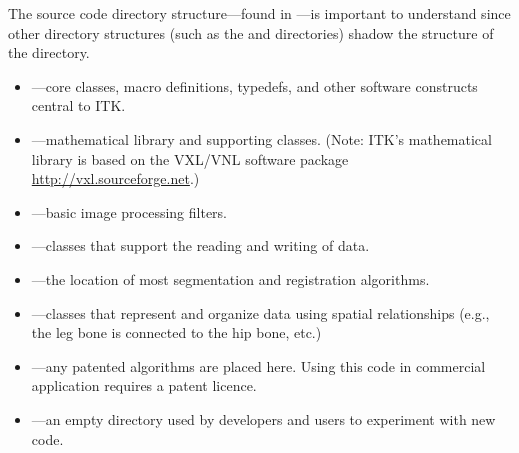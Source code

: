 The source code directory structure---found in ---is 
important to understand since other directory structures (such as the
 and  directories) shadow the structure of the
 directory.
\begin{itemize}
        \item {}---core classes, macro definitions,
        typedefs, and other software constructs central to ITK.
        \item {}---mathematical library and
        supporting classes. (Note: ITK's mathematical library is based
        on the VXL/VNL software package \url{http://vxl.sourceforge.net}.)
        \item {}---basic image processing
        filters.
        \item {}---classes that support the reading
        and writing of data.
        \item {}---the location of most 
        segmentation and registration algorithms.
        \item {}---classes that represent
        and organize data using spatial relationships (e.g., the leg bone
        is connected to the hip bone, etc.)
        \item {}---any patented algorithms are
        placed here. Using this code in commercial application requires
        a patent licence.
        \item {}---an empty directory used by developers
        and users to experiment with new code.
\end{itemize}

